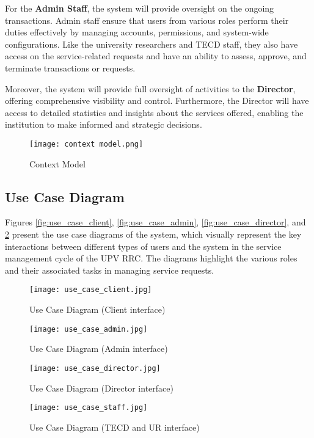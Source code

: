 For the \textbf{Admin Staff}, the system will provide oversight on the ongoing transactions. Admin staff ensure that users from various roles perform their duties effectively by managing accounts, permissions, and system-wide configurations. Like the university researchers and TECD staff, they also have access on the service-related requests and have an ability to assess, approve, and terminate transactions or requests.

\newpage

Moreover, the system will provide full oversight of activities to the \textbf{Director}, offering comprehensive visibility and control. Furthermore, the Director will have access to detailed statistics and insights about the services offered, enabling the institution to make informed and strategic decisions.

\begin{figure}[h]
	\centering 
	\texttt{[image: context model.png]}
	\caption{Context Model}
	\label{fig:context_model}
\end{figure}

\subsection{Use Case Diagram}

Figures \ref{fig:use_case_client}, \ref{fig:use_case_admin}, \ref{fig:use_case_director}, and \ref{fig:use_case_staff} present the use case diagrams of the system, which visually represent the key interactions between different types of users and the system in the service management cycle of the UPV RRC. The diagrams highlight the various roles and their associated tasks in managing service requests.

\newpage

\begin{figure}[h]
	\centering
	\begin{minipage}{0.30\textwidth}
		\centering
		\texttt{[image: use\_case\_client.jpg]}
		\caption{Use Case Diagram (Client interface)}
		\label{fig:use_case_client}
	\end{minipage}%
	\hfill
	\begin{minipage}{0.32\textwidth}
		\centering
		\texttt{[image: use\_case\_admin.jpg]}
		\caption{Use Case Diagram (Admin interface)}
		\label{fig:use_case_admin}
	\end{minipage}
	
	\vspace{0.5cm} %
	
	\begin{minipage}{0.30\textwidth}
		\centering
		\texttt{[image: use\_case\_director.jpg]}
		\caption{Use Case Diagram (Director interface)}
		\label{fig:use_case_director}
	\end{minipage}%
	\hfill
	\begin{minipage}{0.30\textwidth}
		\centering
		\texttt{[image: use\_case\_staff.jpg]}
		\caption{Use Case Diagram (TECD and UR interface)}
		\label{fig:use_case_staff}
	\end{minipage}
\end{figure}

